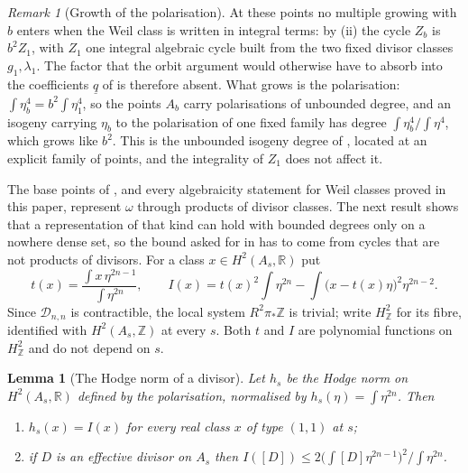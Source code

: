 \documentclass[11pt,reqno]{amsart}
\theoremstyle{plain}
\newtheorem{lemma}[theorem]{Lemma}
\theoremstyle{definition}
\theoremstyle{remark}
\newtheorem{remark}[theorem]{Remark}
\newcommand{\ZZ}{\mathbb{Z}}
\newcommand{\RR}{\mathbb{R}}
\newcommand{\cD}{\mathcal{D}}
\begin{document}
\begin{remark}[Growth of the polarisation]\label{rem:quatdivisible}
At these points no multiple growing with $b$ enters when the Weil class is
written in integral terms: by (ii) the cycle $Z_{b}$
is $b^{2}Z_{1}$, with $Z_{1}$ one integral algebraic cycle built from the two
fixed divisor classes $g_{1},\lambda_{1}$. The factor that the orbit argument
would otherwise have to absorb into the coefficients $\underline{q}$ of
 is therefore absent. What grows is the polarisation:
$\int\eta_{b}^{4}=b^{2}\int\eta_{1}^{4}$, so the points $A_{b}$ carry
polarisations of unbounded degree, and an isogeny carrying $\eta_{b}$ to the
polarisation of one fixed family has degree $\int\eta_{b}^{4}/\int\eta^{4}$,
which grows like $b^{2}$. This is the unbounded isogeny degree of
, located at an explicit family of points, and the
integrality of $Z_{1}$ does not affect it.
\end{remark}

The base points of , and every algebraicity statement
for Weil classes proved in this paper, represent $\omega$ through products of
divisor classes. The next result shows that a representation of that kind
can hold with bounded degrees only on a nowhere dense set, so the bound asked
for in  has to come from cycles that are not products of
divisors. For a class $x\in H^{2}(A_{s},\RR)$ put
\[
  t(x)=\frac{\int x\,\eta^{2n-1}}{\int\eta^{2n}},\qquad
  I(x)=t(x)^{2}\!\int\eta^{2n}-\int\bigl(x-t(x)\eta\bigr)^{2}\eta^{2n-2}.
\]
Since $\cD_{n,n}$ is contractible, the local system $R^{2}\pi_{*}\ZZ$ is
trivial; write $H^{2}_{\ZZ}$ for its fibre, identified with $H^{2}(A_{s},\ZZ)$
at every $s$. Both $t$ and $I$ are polynomial functions on $H^{2}_{\ZZ}$ and
do not depend on $s$.

\begin{lemma}[The Hodge norm of a divisor]\label{lem:nefnorm}
Let $h_{s}$ be the Hodge norm on $H^{2}(A_{s},\RR)$ defined by the
polarisation, normalised by $h_{s}(\eta)=\int\eta^{2n}$. Then
\begin{enumerate}[label=\textup{(\roman*)},nosep]
\item $h_{s}(x)=I(x)$ for every real class $x$ of type $(1,1)$ at $s$;
\item if $D$ is an effective divisor on $A_{s}$ then
  $I([D])\le 2\bigl(\int[D]\eta^{2n-1}\bigr)^{2}\big/\!\int\eta^{2n}$.
\end{enumerate}
\end{lemma}
\end{document}
